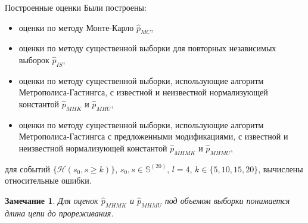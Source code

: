 \documentclass[pdf, 10pt, unicode]{beamer}
\newtheorem{remark}{Замечание}
\begin{document}
\begin{frame}{Построенные оценки}
    Были построены:
    \begin{itemize}
        \item оценки по методу Монте-Карло $\hat{p}_{MC}$,
        \item оценки по методу существенной выборки для повторных независимых выборок $\hat{p}_{IS}$,
        \item оценки по методу существенной выборки, использующие алгоритм Метрополиса-Гастингса, с известной и неизвестной нормализующей константой $\hat{p}_{MHK}$ и $\hat{p}_{MHU}$,
        \item оценки по методу существенной выборки, использующие алгоритм Метрополиса-Гастингса с предложенными модификациями, с известной и неизвестной нормализующей константой $\hat{p}_{MHMK}$ и $\hat{p}_{MHMU}$,
    \end{itemize}
    для событий $\{\mathcal{H}(s_0, s \geq k)\}$, $s_0, s \in \mathbb{S}^{(20)}$, $l = 4$, $k\in \{5, 10, 15, 20\}$, вычислены относительные ошибки. 
    \begin{remark}Для оценок $\hat{p}_{MHMK}$ и $\hat{p}_{MHMU}$ под объемом выборки понимается длина цепи до прореживания.
    \end{remark}
     
\end{frame}
\end{document}

